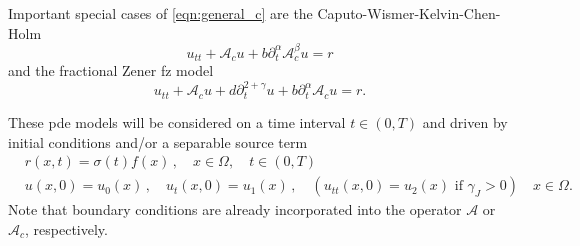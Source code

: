 Important special cases of \eqref{eqn:general_c} are the Caputo-Wismer-Kelvin-Chen-Holm %
\begin{equation}\label{eqn:CH_c}
u_{tt}+\mathcal{A}_c u+ b \partial_t^{\alpha} \mathcal{A}_c^\beta u=r
\end{equation}
and the fractional Zener {\sc fz} model
\begin{equation}\label{eqn:FZ_c}
u_{tt}+\mathcal{A}_c u+ d \partial_t^{2+\gamma}  u + b \partial_t^{\alpha} \mathcal{A}_c u=r .
\end{equation}

These {\sc pde} models will be considered on a time interval $t\in(0,T)$ and driven by initial conditions and/or a separable source term
\begin{equation}\label{eqn:init_source}
\begin{aligned}
&r(x,t)=\sigma(t)f(x)\,, \quad x\in\Omega, \quad t\in(0,T)\\
&u(x,0)=u_0(x)\,, \quad u_t(x,0)=u_1(x)\,, \quad (u_{tt}(x,0)=u_2(x)\mbox{ if }\gamma_J>0)\quad x\in\Omega. \end{aligned}
\end{equation}
Note that boundary conditions are already incorporated into the operator $\mathcal{A}$ or $\mathcal{A}_c$, respectively. 
